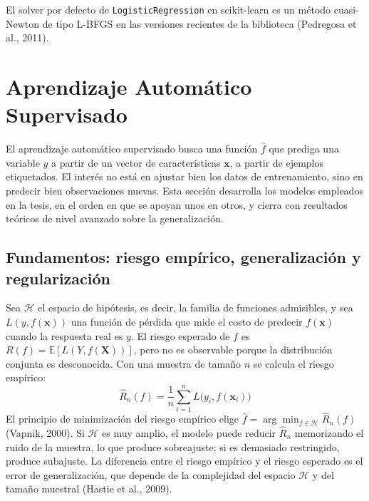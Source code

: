 El solver por defecto de \texttt{LogisticRegression} en scikit-learn es un método cuasi-Newton de tipo L-BFGS en las versiones recientes de la biblioteca (Pedregosa et al., 2011). %

\section{Aprendizaje Automático Supervisado}\label{sec:ml}

El aprendizaje automático supervisado busca una función $\hat{f}$ que prediga una variable $y$ a partir de un vector de características $\mathbf{x}$, a partir de ejemplos etiquetados. El interés no está en ajustar bien los datos de entrenamiento, sino en predecir bien observaciones nuevas. Esta sección desarrolla los modelos empleados en la tesis, en el orden en que se apoyan unos en otros, y cierra con resultados teóricos de nivel avanzado sobre la generalización.

\subsection{Fundamentos: riesgo empírico, generalización y regularización}
Sea $\mathcal{H}$ el espacio de hipótesis, es decir, la familia de funciones admisibles, y sea $L(y,f(\mathbf{x}))$ una función de pérdida que mide el costo de predecir $f(\mathbf{x})$ cuando la respuesta real es $y$. El riesgo esperado de $f$ es $R(f)=\mathbb{E}[L(Y,f(\mathbf{X}))]$, pero no es observable porque la distribución conjunta es desconocida. Con una muestra de tamaño $n$ se calcula el riesgo empírico:
\begin{equation}
\widehat{R}_n(f) = \frac{1}{n}\sum_{i=1}^n L\big(y_i, f(\mathbf{x}_i)\big)
\label{eq:riesgo_empirico}
\end{equation}
El principio de minimización del riesgo empírico elige $\hat{f}=\arg\min_{f\in\mathcal{H}}\widehat{R}_n(f)$ (Vapnik, 2000). Si $\mathcal{H}$ es muy amplio, el modelo puede reducir $\widehat{R}_n$ memorizando el ruido de la muestra, lo que produce sobreajuste; si es demasiado restringido, produce subajuste. La diferencia entre el riesgo empírico y el riesgo esperado es el error de generalización, que depende de la complejidad del espacio $\mathcal{H}$ y del tamaño muestral (Hastie et al., 2009).

